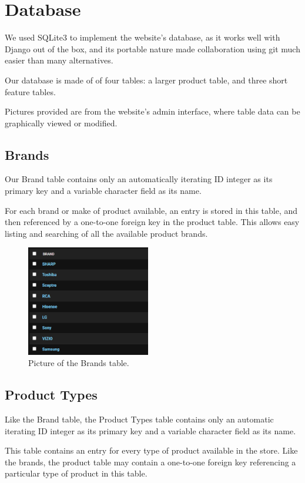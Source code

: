 \documentclass[sigconf]{acmart}
\begin{document}
\section{Database}
We used SQLite3 to implement the website's database, as it works well with Django out of the box, and its portable nature made collaboration using git much easier than many alternatives. \par
Our database is made of of four tables: a larger product table, and three short feature tables. \par
Pictures provided are from the website's admin interface, where table data can be graphically viewed or modified.

\subsection{Brands}
Our Brand table contains only an automatically iterating ID integer as its primary key and a variable character field as its name.\par
For each brand or make of product available, an entry is stored in this table, and then referenced by a one-to-one foreign key in the product table. This allows easy listing and searching of all the available product brands.

\begin{figure}[H] %
    \centering
	\includegraphics[width=0.48\textwidth]{Figures/brands.png} %
	\caption{Picture of the Brands table.}
\end{figure}

\pagebreak
\subsection{Product Types}
Like the Brand table, the Product Types table contains only an automatic iterating ID integer as its primary key and a variable character field as its name. \par
This table contains an entry for every type of product available in the store. Like the brands, the product table may contain a one-to-one foreign key referencing a particular type of product in this table.
\end{document}
